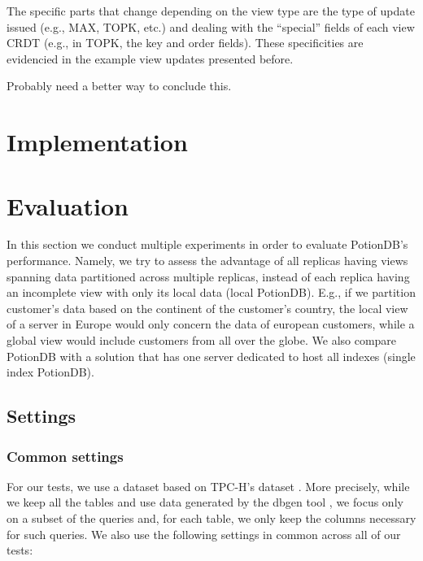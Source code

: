 \documentclass{vldb}
\newcommand{\grumbler}[2]{{\color{red}{\bf #1:} #2}}
\newcommand{\andre}[1]{\grumbler{andre}{#1}}
\begin{document}
The specific parts that change depending on the view type are the type of update issued (e.g., MAX, TOPK, etc.) and dealing with the ``special'' fields of each view CRDT (e.g., in TOPK, the key and order fields).
These specificities are evidencied in the example view updates presented before.

\andre{Probably need a better way to conclude this.}









\section{Implementation}

\section{Evaluation}

In this section we conduct multiple experiments in order to evaluate PotionDB's performance.
Namely, we try to assess the advantage of all replicas having views spanning data partitioned across multiple replicas, instead of each replica having an incomplete view with only its local data (local PotionDB).
E.g., if we partition customer's data based on the continent of the customer's country, the local view of a server in Europe would only concern the data of european customers, while a global view would include customers from all over the globe.
We also compare PotionDB with a solution that has one server dedicated to host all indexes (single index PotionDB).

\subsection{Settings}

\subsubsection{Common settings}

For our tests, we use a dataset based on TPC-H's dataset \cite{tpch}.
More precisely, while we keep all the tables and use data generated by the dbgen tool \cite{tpch}, we focus only on a subset of the queries and, for each table, we only keep the columns necessary for such queries.
We also use the following settings in common across all of our tests:
\end{document}

